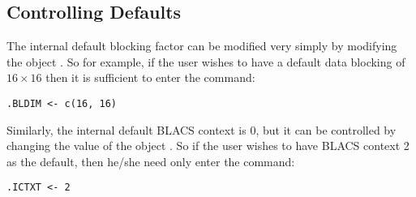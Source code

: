 \subsection[]{Controlling Defaults}

The internal default blocking factor can be modified very simply by modifying the object .  So for example, if the user wishes to have a default data blocking of $16\times 16$ then it is sufficient to enter the command:
\begin{lstlisting}[language=rr]
.BLDIM <- c(16, 16)
\end{lstlisting}

Similarly, the internal default BLACS context is 0, but it can be controlled by changing the value of the object .  So if the user wishes to have BLACS context 2 as the default, then he/she need only enter the command:
\begin{lstlisting}[language=rr]
.ICTXT <- 2
\end{lstlisting}

